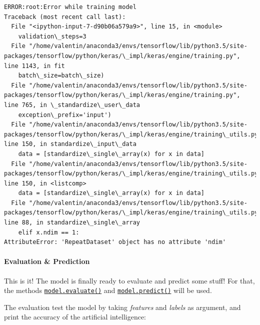 \documentclass[11pt]{article}
\begin{document}
    \begin{Verbatim}[commandchars=\\\{\}]
ERROR:root:Error while training model
Traceback (most recent call last):
  File "<ipython-input-7-d90b06a579a9>", line 15, in <module>
    validation\_steps=3
  File "/home/valentin/anaconda3/envs/tensorflow/lib/python3.5/site-packages/tensorflow/python/keras/\_impl/keras/engine/training.py", line 1143, in fit
    batch\_size=batch\_size)
  File "/home/valentin/anaconda3/envs/tensorflow/lib/python3.5/site-packages/tensorflow/python/keras/\_impl/keras/engine/training.py", line 765, in \_standardize\_user\_data
    exception\_prefix='input')
  File "/home/valentin/anaconda3/envs/tensorflow/lib/python3.5/site-packages/tensorflow/python/keras/\_impl/keras/engine/training\_utils.py", line 150, in standardize\_input\_data
    data = [standardize\_single\_array(x) for x in data]
  File "/home/valentin/anaconda3/envs/tensorflow/lib/python3.5/site-packages/tensorflow/python/keras/\_impl/keras/engine/training\_utils.py", line 150, in <listcomp>
    data = [standardize\_single\_array(x) for x in data]
  File "/home/valentin/anaconda3/envs/tensorflow/lib/python3.5/site-packages/tensorflow/python/keras/\_impl/keras/engine/training\_utils.py", line 88, in standardize\_single\_array
    elif x.ndim == 1:
AttributeError: 'RepeatDataset' object has no attribute 'ndim'

    \end{Verbatim}

    \hypertarget{evaluation-prediction}{%
\paragraph{Evaluation \& Prediction}\label{evaluation-prediction}}

    This is it! The model is finally ready to evaluate and predict some
stuff! For that, the methods
\href{https://www.tensorflow.org/api_docs/python/tf/keras/Model\#evaluate}{\texttt{model.evaluate()}}
and
\href{https://www.tensorflow.org/api_docs/python/tf/keras/Model\#predict}{\texttt{model.predict()}}
will be used.

The evaluation test the model by taking \emph{features} and
\emph{labels} as argument, and print the accuracy of the artificial
intelligence:
\end{document}
